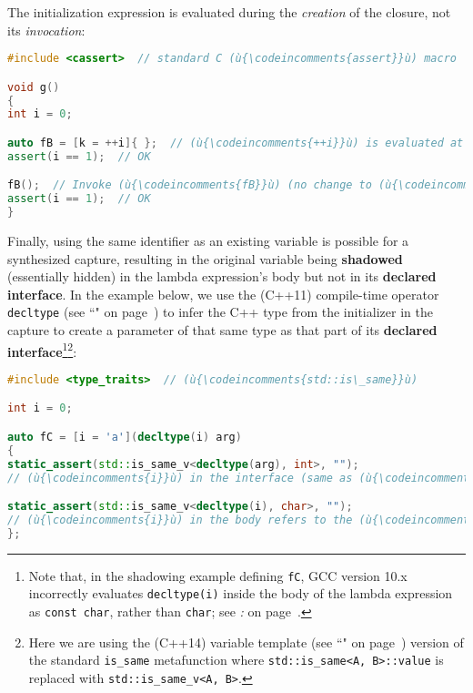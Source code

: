 \noindent The initialization expression is evaluated during the \emph{creation} of
the closure, not its \emph{invocation}:

\begin{lstlisting}[language=C++]
#include <cassert>  // standard C (ù{\codeincomments{assert}}ù) macro

void g()
{
int i = 0;

auto fB = [k = ++i]{ };  // (ù{\codeincomments{++i}}ù) is evaluated at creation only.
assert(i == 1);  // OK

fB();  // Invoke (ù{\codeincomments{fB}}ù) (no change to (ù{\codeincomments{i}}ù)).
assert(i == 1);  // OK
}
\end{lstlisting}

\noindent Finally, using the same identifier as an existing
variable is possible for a synthesized capture, resulting in the original variable
being \textbf{shadowed} (essentially hidden) in the lambda expression's
body but not in its \textbf{declared interface}. In the example below,
we use the (C++11) compile-time operator
\texttt{decltype} (see ``" on page~\pageref{decltype}) to infer the C++ type from the
initializer in the capture to create a parameter of that same type as
that part of its \textbf{declared interface}{\cprotect\footnote{Note
that, in the shadowing example defining \texttt{fC}, GCC version 10.x
incorrectly evaluates \texttt{decltype(i)} inside the body of the
lambda expression as \texttt{const}~\texttt{char}, rather than
\texttt{char}; see \textit{: } on page~\pageref{potential-pitfalls-lambdacapture}.}}{\cprotect\footnote{Here we are using the (C++14) variable
template (see ``" on page~\pageref{variable-templates}) version of the standard \texttt{is\_same} metafunction where \texttt{std::is\_same<A,}~\texttt{B>::value} is replaced with
\texttt{std::is\_same\_v<A,}~\texttt{B>}.}}:

\begin{lstlisting}[language=C++]
#include <type_traits>  // (ù{\codeincomments{std::is\_same}}ù)

int i = 0;

auto fC = [i = 'a'](decltype(i) arg)
{
static_assert(std::is_same_v<decltype(arg), int>, "");
// (ù{\codeincomments{i}}ù) in the interface (same as (ù{\codeincomments{arg}}ù)) refers to the (ù{\codeincomments{int}}ù) parameter.

static_assert(std::is_same_v<decltype(i), char>, "");
// (ù{\codeincomments{i}}ù) in the body refers to the (ù{\codeincomments{char}}ù) data member deduced at capture.
};
\end{lstlisting}

